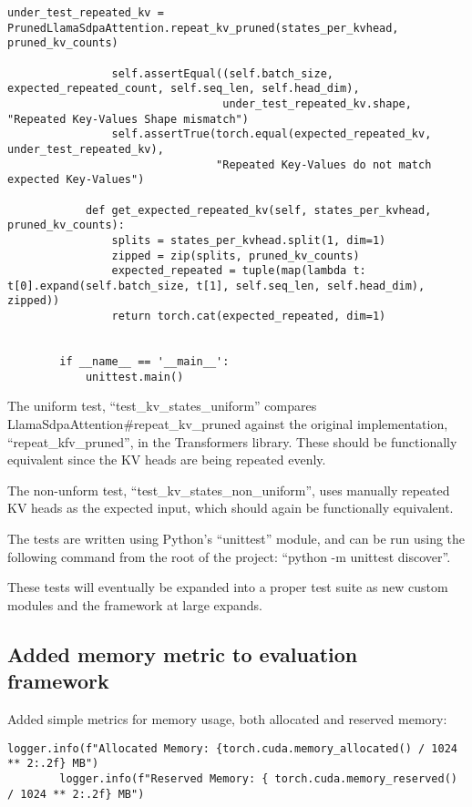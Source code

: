 \documentclass{article}
\begin{document}
\begin{lstlisting}[label={lst:repeat_kv_pruned}]
                under_test_repeated_kv = PrunedLlamaSdpaAttention.repeat_kv_pruned(states_per_kvhead, pruned_kv_counts)

                self.assertEqual((self.batch_size, expected_repeated_count, self.seq_len, self.head_dim),
                                 under_test_repeated_kv.shape, "Repeated Key-Values Shape mismatch")
                self.assertTrue(torch.equal(expected_repeated_kv, under_test_repeated_kv),
                                "Repeated Key-Values do not match expected Key-Values")

            def get_expected_repeated_kv(self, states_per_kvhead, pruned_kv_counts):
                splits = states_per_kvhead.split(1, dim=1)
                zipped = zip(splits, pruned_kv_counts)
                expected_repeated = tuple(map(lambda t: t[0].expand(self.batch_size, t[1], self.seq_len, self.head_dim), zipped))
                return torch.cat(expected_repeated, dim=1)


        if __name__ == '__main__':
            unittest.main()

    \end{lstlisting}

    The uniform test, ``test\_kv\_states\_uniform'' compares LlamaSdpaAttention\#repeat\_kv\_pruned against the original implementation, ``repeat\_kfv\_pruned'', in the Transformers library.
    These should be functionally equivalent since the KV heads are being repeated evenly.

    The non-unform test, ``test\_kv\_states\_non\_uniform'', uses manually repeated KV heads as the expected input, which should again be functionally equivalent.

    The tests are written using Python's ``unittest'' module, and can be run using the following command from the root of the project: ``python -m unittest discover''.

    These tests will eventually be expanded into a proper test suite as new custom modules and the framework at large expands.

    \subsection{Added memory metric to evaluation framework}\label{subsec:added-memory-metric-to-evaluation-framework}

    Added simple metrics for memory usage, both allocated and reserved memory:
    \begin{lstlisting}[label={lst:memory}]
        logger.info(f"Allocated Memory: {torch.cuda.memory_allocated() / 1024 ** 2:.2f} MB")
        logger.info(f"Reserved Memory: { torch.cuda.memory_reserved() / 1024 ** 2:.2f} MB")
    \end{lstlisting}
\end{document}

